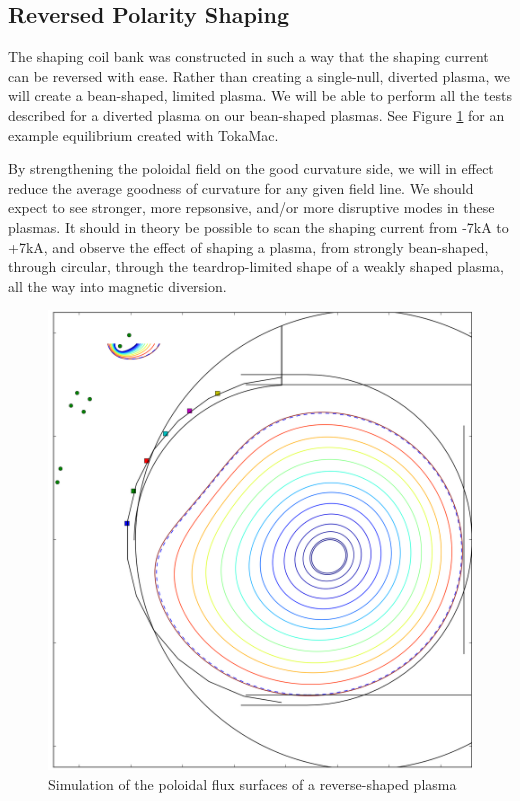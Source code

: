 \documentclass[aps,prl,twocolumn,superscriptaddress,groupedaddress]{revtex4}  %
\begin{document}
\subsection{Reversed Polarity Shaping}
The shaping coil bank was constructed in such a way that the shaping current can be reversed with ease.  Rather than creating a single-null, diverted plasma, we will create a bean-shaped, limited plasma.  We will be able to perform all the tests described for a diverted plasma on our bean-shaped plasmas.  See Figure \ref{bean_plasma_flux_and_modes} for an example equilibrium created with TokaMac.\par
By strengthening the poloidal field on the good curvature side, we will in effect reduce the average goodness of curvature for any given field line.  We should expect to see stronger, more repsonsive, and/or more disruptive modes in these plasmas.  It should in theory be possible to scan the shaping current from -7kA to +7kA, and observe the effect of shaping a plasma, from strongly bean-shaped, through circular, through the teardrop-limited shape of a weakly shaped plasma, all the way into magnetic diversion.
\begin{figure}[htb]
	\centering
\includegraphics[scale=.22]{../Plots/bean_plasma_flux_and_currents_85385_90cm_250kPA_neg7kSH_cropped.png}\caption{Simulation of the poloidal flux surfaces of a reverse-shaped plasma}
	\label{bean_plasma_flux_and_modes}
	\end{figure}
\end{document}

